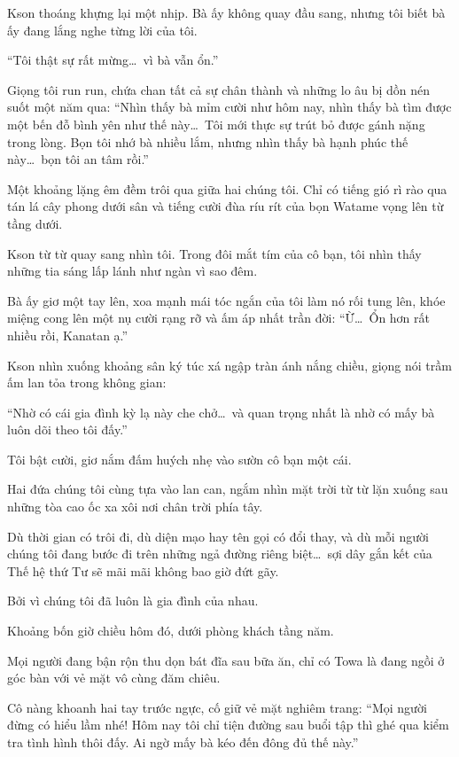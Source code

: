 \documentclass[../main.tex]{subfiles}
\begin{document}
Kson thoáng khựng lại một nhịp. Bà ấy không quay đầu sang, nhưng tôi biết bà ấy đang lắng nghe từng lời của tôi.

``Tôi thật sự rất mừng\dots\ vì bà vẫn ổn.''

Giọng tôi run run, chứa chan tất cả sự chân thành và những lo âu bị dồn nén suốt một năm qua: ``Nhìn thấy bà mỉm cười như hôm nay, nhìn thấy bà tìm được một bến đỗ bình yên như thế này\dots\ Tôi mới thực sự trút bỏ được gánh nặng trong lòng. Bọn tôi nhớ bà nhiều lắm, nhưng nhìn thấy bà hạnh phúc thế này\dots\ bọn tôi an tâm rồi.''

Một khoảng lặng êm đềm trôi qua giữa hai chúng tôi. Chỉ có tiếng gió rì rào qua tán lá cây phong dưới sân và tiếng cười đùa ríu rít của bọn Watame vọng lên từ tầng dưới.

Kson từ từ quay sang nhìn tôi. Trong đôi mắt tím của cô bạn, tôi nhìn thấy những tia sáng lấp lánh như ngàn vì sao đêm.

Bà ấy giơ một tay lên, xoa mạnh mái tóc ngắn của tôi làm nó rối tung lên, khóe miệng cong lên một nụ cười rạng rỡ và ấm áp nhất trần đời: ``Ừ\dots\ Ổn hơn rất nhiều rồi, Kanatan ạ.''

Kson nhìn xuống khoảng sân ký túc xá ngập tràn ánh nắng chiều, giọng nói trầm ấm lan tỏa trong không gian:

``Nhờ có cái gia đình kỳ lạ này che chở\dots\ và quan trọng nhất là nhờ có mấy bà luôn dõi theo tôi đấy.''

Tôi bật cười, giơ nắm đấm huých nhẹ vào sườn cô bạn một cái.

Hai đứa chúng tôi cùng tựa vào lan can, ngắm nhìn mặt trời từ từ lặn xuống sau những tòa cao ốc xa xôi nơi chân trời phía tây.

Dù thời gian có trôi đi, dù diện mạo hay tên gọi có đổi thay, và dù mỗi người chúng tôi đang bước đi trên những ngả đường riêng biệt\dots\ sợi dây gắn kết của Thế hệ thứ Tư sẽ mãi mãi không bao giờ đứt gãy.

Bởi vì chúng tôi đã luôn là gia đình của nhau.

\omk

\pov{-}

Khoảng bốn giờ chiều hôm đó, dưới phòng khách tầng năm.

Mọi người đang bận rộn thu dọn bát đĩa sau bữa ăn, chỉ có Towa là đang ngồi ở góc bàn với vẻ mặt vô cùng đăm chiêu.

Cô nàng khoanh hai tay trước ngực, cố giữ vẻ mặt nghiêm trang: ``Mọi người đừng có hiểu lầm nhé! Hôm nay tôi chỉ tiện đường sau buổi tập thì ghé qua kiểm tra tình hình thôi đấy. Ai ngờ mấy bà kéo đến đông đủ thế này.''
\end{document}
